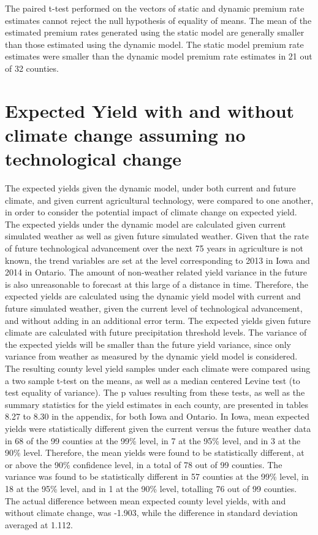 The paired t-test performed on the vectors of static and dynamic premium rate estimates cannot reject the null hypothesis of equality of means. The mean of the estimated premium rates generated using the static model are generally smaller than those estimated using the dynamic model. The static model premium rate estimates were smaller than the dynamic model premium rate estimates in 21 out of 32 counties. 




\section{Expected Yield with and without climate change assuming no technological change}

The expected yields given the dynamic model, under both current and future climate, and given current agricultural technology, were compared to one another, in order to consider the potential impact of climate change on expected yield. The expected yields under the dynamic model are calculated given current simulated weather as well as given future simulated weather. Given that the rate of future technological advancement over the next 75 years in agriculture is not known, the trend variables are set at the level corresponding to 2013 in Iowa and 2014 in Ontario. The amount of non-weather related yield variance in the future is also unreasonable to forecast at this large of a distance in time. Therefore, the expected yields are calculated using the dynamic yield model with current and future simulated weather, given the current level of technological advancement, and without adding in an additional error term. The expected yields given future climate are calculated with future precipitation threshold levels. The variance of the expected yields will be smaller than the future yield variance, since only variance from weather as measured by the dynamic yield model is considered. The resulting county level yield samples under each climate were compared using a two sample t-test on the means, as well as a median centered Levine test (to test equality of variance). The p values resulting from these tests, as well as the summary statistics for the yield estimates in each county, are presented in tables 8.27 to 8.30 in the appendix, for both Iowa and Ontario. 
 In Iowa, mean expected yields were statistically different given the current versus the future weather data in 68 of the 99 counties at the 99\% level, in 7 at the 95\% level, and in 3 at the 90\% level. Therefore, the mean yields were found to be statistically different, at or above the 90\% confidence level, in a total of 78 out of 99 counties. The variance was found to be statistically different in 57 counties at the 99\% level, in 18 at the 95\% level, and in 1 at the 90\% level, totalling 76 out of 99 counties. The actual difference between mean expected county level yields, with and without climate change, was -1.903, while the difference in standard deviation averaged at 1.112. 

